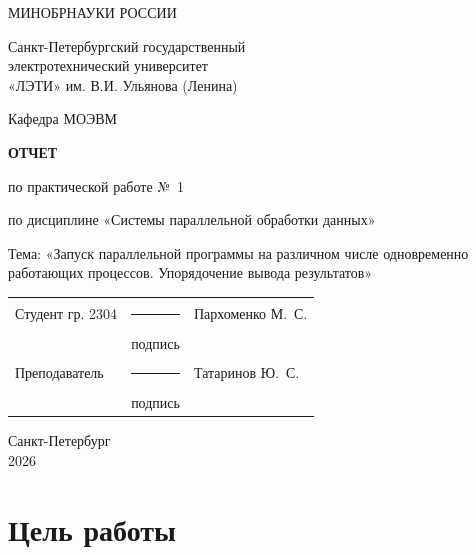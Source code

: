 \documentclass[14pt,a4paper]{extarticle}
\newcommand{\Ministry}{МИНОБРНАУКИ РОССИИ}
\newcommand{\University}{Санкт-Петербургский государственный\\
электротехнический университет\\
«ЛЭТИ» им. В.И. Ульянова (Ленина)}
\newcommand{\Department}{МОЭВМ}
\newcommand{\StudentName}{Пархоменко М.~С.}
\newcommand{\StudentGroup}{2304}
\newcommand{\TeacherName}{Татаринов Ю.~С.}
\newcommand{\City}{Санкт-Петербург}
\begin{document}
\begin{titlepage}
    \thispagestyle{empty}
    \begin{center}
        \Ministry

        \University

        Кафедра \Department
    \end{center}

    \vspace{2cm}

    \begin{center}
        \textbf{ОТЧЕТ}

        по практической работе №~1

        по дисциплине «Системы параллельной обработки данных»

        \vspace{0.5cm}
        Тема: «Запуск параллельной программы на различном числе
        одновременно работающих процессов. Упорядочение вывода результатов»
    \end{center}

    \vspace{2cm}

    \begin{flushright}
        \begin{minipage}{0.8\textwidth}
            \begin{tabularx}{\linewidth}{@{}p{4.8cm}
                >{\centering\arraybackslash}p{2.8cm} X@{}}
                Студент гр. \StudentGroup
                & \rule{2.5cm}{0.4pt} & \StudentName\\
                & подпись & \\[0.8cm]
                Преподаватель
                & \rule{2.5cm}{0.4pt} & \TeacherName\\
                & подпись &
            \end{tabularx}
        \end{minipage}
    \end{flushright}

    \vfill

    \begin{center}
        \City\\
        2026
    \end{center}
\end{titlepage}

\setcounter{page}{2}

\section{Цель работы}
\end{document}
